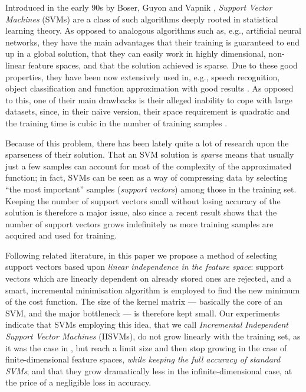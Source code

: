 \documentclass[10pt,twocolumn,letterpaper]{article}
\begin{document}
Introduced in the early 90s by Boser, Guyon and Vapnik \cite{BGV92},
\emph{Support Vector Machines} (SVMs) are a class of such algorithms
deeply rooted in statistical learning theory. As opposed to analogous
algorithms such as, e.g., artificial neural networks, they have the
main advantages that their training is guaranteed to end up in a
global solution, that they can easily work in highly dimensional,
non-linear feature spaces, and that the solution achieved is
sparse. Due to these good properties, they have been now extensively
used in, e.g., speech recognition, object classification and function
approximation with good results \cite{Cristianini00}. As opposed to
this, one of their main drawbacks is their alleged inability to cope
with large datasets, since, in their na\"\i ve version, their space
requirement is quadratic and the training time is cubic in the number
of training samples \cite{KeerthiCDC06}.

Because of this problem, there has been lately quite a lot of research
upon the sparseness of their solution. That an SVM solution is
\emph{sparse} means that usually just a few samples can account for
most of the complexity of the approximated function; in fact, SVMs can
be seen as a way of compressing data by selecting ``the most
important'' samples (\emph{support vectors}) among those in the
training set. Keeping the number of support vectors small without
losing accuracy of the solution is therefore a major issue, also since
a recent result \cite{Steinwart03} shows that the number of support
vectors grows indefinitely as more training samples are acquired and
used for training.

Following related literature, in this paper we propose a method of
selecting support vectors based upon \emph{linear independence in the
feature space}: support vectors which are linearly dependent on
already stored ones are rejected, and a smart, incremental
minimisation algorithm is employed to find the new minimum of the cost
function. The size of the kernel matrix --- basically the core of an
SVM, and the major bottleneck --- is therefore kept small. Our
experiments indicate that SVMs employing this idea, that we call
\emph{Incremental Independent Support Vector Machines} (IISVMs), do
not grow linearly with the training set, as it was the case in
\cite{Steinwart03}, but reach a limit size and then stop growing in
the case of finite-dimensional feature spaces, \emph{while keeping the
full accuracy of standard SVMs}; and that they grow dramatically less
in the infinite-dimensional case, at the price of a negligible loss in
accuracy.
\end{document}
